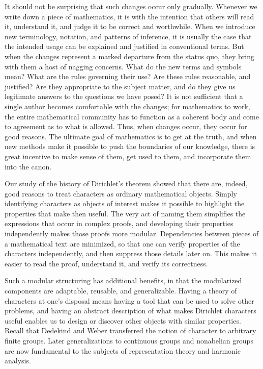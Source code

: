 \documentclass[11pt]{article}
\begin{document}
It should not be surprising that such changes occur only gradually. Whenever we write down a piece of mathematics, it is with the intention that others will read it, understand it, and judge it to be correct and worthwhile. When we introduce new terminology, notation, and patterns of inference, it is usually the case that the intended usage can be explained and justified in conventional terms. But when the changes represent a marked departure from the status quo, they bring with them a host of nagging concerns. What do the new terms and symbols mean? What are the rules governing their use? Are these rules reasonable, and justified? Are they appropriate to the subject matter, and do they give us legitimate answers to the questions we have posed? It is not sufficient that a single author becomes comfortable with the changes; for mathematics to work, the entire mathematical community has to function as a coherent body and come to agreement as to what is allowed. Thus, when changes occur, they occur for good reasons. The ultimate goal of mathematics is to get at the truth, and when new methods make it possible to push the boundaries of our knowledge, there is great incentive to make sense of them, get used to them, and incorporate them into the canon.

Our study of the history of Dirichlet's theorem showed that there are, indeed, good reasons to treat characters as ordinary mathematical objects. Simply identifying characters as objects of interest makes it possible to highlight the properties that make then useful. The very act of naming them simplifies the expressions that occur in complex proofs, and developing their properties independently makes those proofs more modular. Dependencies between pieces of a mathematical text are minimized, so that one can verify properties of the characters independently, and then suppress those details later on. This makes it easier to read the proof, understand it, and verify its correctness.

Such a modular structuring has additional benefits, in that the modularized components are adaptable, reusable, and generalizable. Having a theory of characters at one's disposal means having a tool that can be used to solve other problems, and having an abstract description of what makes Dirichlet characters useful enables us to design or discover other objects with similar properties. Recall that Dedekind and Weber transferred the notion of character to arbitrary finite groups. Later generalizations to continuous groups and nonabelian groups are now fundamental to the subjects of representation theory and harmonic analysis.
\end{document}
